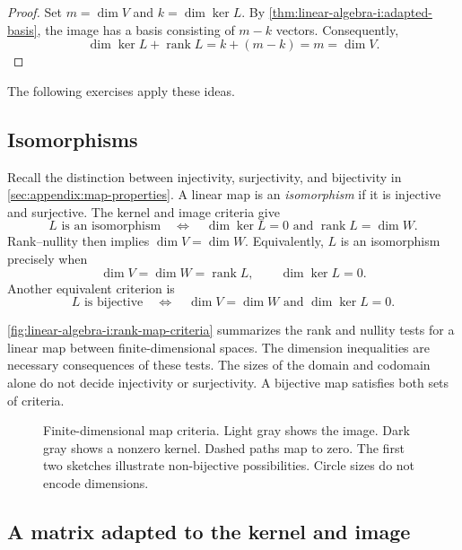 \begin{proof}
  Set \(m=\dim V\) and \(k=\dim\ker L\). By
  \autoref{thm:linear-algebra-i:adapted-basis}, the image has a basis
  consisting of \(m-k\) vectors. Consequently,
  \[
    \dim\ker L+\operatorname{rank}L=k+(m-k)=m=\dim V.
  \]
\end{proof}

The following exercises apply these ideas.



\subsection{Isomorphisms}

Recall the distinction between injectivity, surjectivity, and bijectivity
in \autoref{sec:appendix:map-properties}.
A linear map is an \emph{isomorphism} if it is injective and surjective.
The kernel and image criteria give
\[
  L\text{ is an isomorphism}
    \quad\Longleftrightarrow\quad
  \dim\ker L=0\text{ and }\operatorname{rank}L=\dim W.
\]
Rank--nullity then implies \(\dim V=\dim W\). Equivalently, \(L\) is an
isomorphism precisely when
\[
  \dim V=\dim W=\operatorname{rank}L,\qquad \dim\ker L=0.
\]
Another equivalent criterion is
\[
  L\text{ is bijective}
    \quad\Longleftrightarrow\quad
  \dim V=\dim W\text{ and }\dim\ker L=0.
\]



\autoref{fig:linear-algebra-i:rank-map-criteria} summarizes the
rank and nullity tests for a linear map between finite-dimensional spaces.
The dimension inequalities are necessary consequences of these tests.
The sizes of the domain and codomain alone do not decide injectivity
or surjectivity. A bijective map satisfies both sets of criteria.

\begin{figure}[htbp]
  \centering
  
  \caption[Finite-dimensional map criteria]{Finite-dimensional map criteria. Light gray shows the image.
    Dark gray shows a nonzero kernel. Dashed paths map to zero.
    The first two sketches illustrate non-bijective possibilities.
    Circle sizes do not encode dimensions.}
  \label{fig:linear-algebra-i:rank-map-criteria}
\end{figure}

\subsection{A matrix adapted to the kernel and image}

